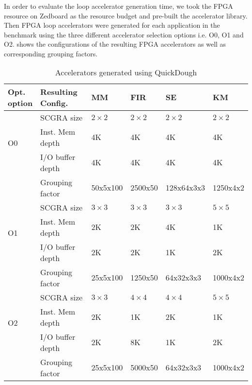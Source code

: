 In order to evaluate the loop accelerator generation time, we took the FPGA resource on Zedboard as
the resource budget and pre-built the accelerator library.
Then FPGA loop accelerators were generated for each application in the benchmark using the three
different accelerator selection options i.e. O0, O1 and O2.  
 shows the configurations of the resulting
FPGA accelerators as well as corresponding grouping factors. 

\begin{table}
\footnotesize
\centering
\caption{Accelerators generated using QuickDough \label{tab:final-acc-config}}{
        \begin{tabular}{l|l|l|l|l|l}
            \hline
            \tabincell{c}{Opt. \\ option} & \tabincell{c}{Resulting \\ Config.} & MM & FIR & SE & KM \\ \hline
            \multirow{3}{*}{O0}  & SCGRA size & $2 \times 2$ & $2 \times 2$ & $2 \times 2$ & $2 \times 2$ \\ \cline{2-6} 
                                & Inst. Mem depth & 4K  & 4K & 4K & 4K \\ \cline{2-6} 
                                & I/O buffer depth & 4K & 4K & 4K & 4K \\ \cline{2-6}
                                & Grouping factor & 50x5x100 & 2500x50 & 128x64x3x3 & 1250x4x2 \\ \hline
            \multirow{3}{*}{O1}  & SCGRA size & $3 \times 3$  & $3 \times 3$  & $3 \times 3$  & $5
            \times 5$  \\ \cline{2-6} 
                                & Inst. Mem depth & 2K & 2K & 4K & 1K \\ \cline{2-6} 
                                & I/O buffer depth & 2K & 2K & 1K & 2K \\ \cline{2-6}
                                & Grouping factor & 25x5x100 & 1250x50 & 64x32x3x3 & 1000x4x2\\ \hline
            \multirow{3}{*}{O2}  & SCGRA size & $3 \times 3$ & $4 \times 4$  & $4 \times 4$  & $5
            \times 5$  \\ \cline{2-6} 
                                & Inst. Mem depth & 2K & 1K & 2K & 1K \\ \cline{2-6} 
                                & I/O buffer depth & 2K & 8K & 1K & 2K \\ \cline{2-6} 
                                & Grouping factor & 25x5x100 & 5000x50 & 64x32x3x3 & 1000x4x2 \\ \hline

        \end{tabular}
    }
\end{table}

